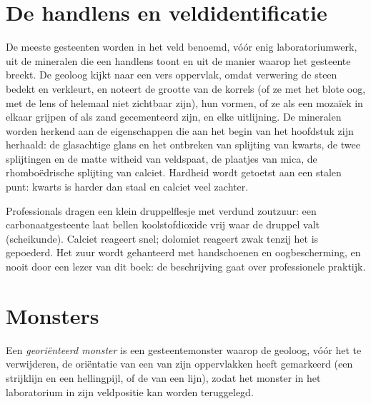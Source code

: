 \section{De handlens en veldidentificatie}

De meeste gesteenten worden in het veld benoemd, vóór enig laboratoriumwerk, uit de mineralen die een handlens toont en uit de
manier waarop het gesteente breekt. De geoloog kijkt naar een vers oppervlak, omdat verwering de steen bedekt en verkleurt, en
noteert de grootte van de korrels (of ze met het blote oog, met de lens of helemaal niet zichtbaar zijn), hun vormen, of ze
als een mozaïek in elkaar grijpen of als zand gecementeerd zijn, en elke uitlijning. De mineralen worden herkend aan de
eigenschappen die aan het begin van het hoofdstuk zijn herhaald: de glasachtige glans en het ontbreken van splijting van
kwarts, de twee splijtingen en de matte witheid van veldspaat, de plaatjes van mica, de rhomboëdrische splijting van calciet.
Hardheid wordt getoetst aan een stalen punt: kwarts is harder dan staal en calciet veel zachter.

Professionals dragen een klein druppelflesje met verdund zoutzuur: een carbonaatgesteente laat bellen koolstofdioxide vrij
waar de druppel valt (scheikunde). Calciet reageert snel; dolomiet reageert zwak tenzij het is gepoederd. Het zuur wordt
gehanteerd met handschoenen en oogbescherming, en nooit door een lezer van dit boek: de beschrijving gaat over professionele
praktijk.

\section{Monsters}

\begin{definition}\label{def:b1:field-lab-methods-1:sample}
Een \emph{georiënteerd monster} is een gesteentemonster waarop de geoloog, vóór het te verwijderen,
de oriëntatie van een van zijn oppervlakken heeft gemarkeerd (een strijklijn en een hellingpijl, of de  van een lijn),
zodat het monster in het laboratorium in zijn veldpositie kan worden teruggelegd.
\end{definition}

